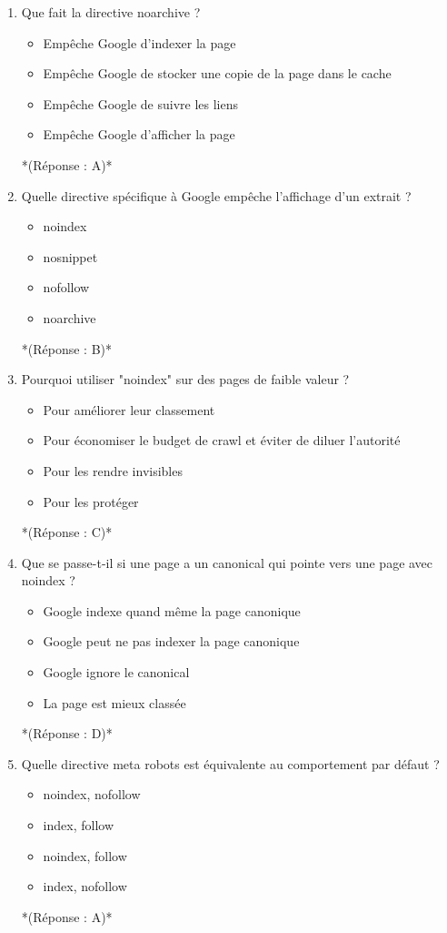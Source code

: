 \documentclass[12pt,a4paper,twoside]{report}
\begin{document}
\begin{enumerate}
\item Que fait la directive noarchive ?
\begin{itemize}
\item[A)] Empêche Google d'indexer la page
\item[B)] Empêche Google de stocker une copie de la page dans le cache
\item[C)] Empêche Google de suivre les liens
\item[D)] Empêche Google d'afficher la page
\end{itemize}
*(Réponse : A)*

\item Quelle directive spécifique à Google empêche l'affichage d'un extrait ?
\begin{itemize}
\item[A)] noindex
\item[B)] nosnippet
\item[C)] nofollow
\item[D)] noarchive
\end{itemize}
*(Réponse : B)*

\item Pourquoi utiliser "noindex" sur des pages de faible valeur ?
\begin{itemize}
\item[A)] Pour améliorer leur classement
\item[B)] Pour économiser le budget de crawl et éviter de diluer l'autorité
\item[C)] Pour les rendre invisibles
\item[D)] Pour les protéger
\end{itemize}
*(Réponse : C)*

\item Que se passe-t-il si une page a un canonical qui pointe vers une page avec noindex ?
\begin{itemize}
\item[A)] Google indexe quand même la page canonique
\item[B)] Google peut ne pas indexer la page canonique
\item[C)] Google ignore le canonical
\item[D)] La page est mieux classée
\end{itemize}
*(Réponse : D)*

\item Quelle directive meta robots est équivalente au comportement par défaut ?
\begin{itemize}
\item[A)] noindex, nofollow
\item[B)] index, follow
\item[C)] noindex, follow
\item[D)] index, nofollow
\end{itemize}
*(Réponse : A)*


\end{enumerate}
\end{document}
